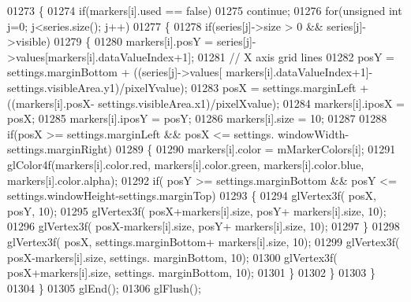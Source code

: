 \begin{DoxyCode}
{{{{{{{{{{01273         \{
01274             \textcolor{keywordflow}{if}(markers[i].used == \textcolor{keyword}{false})
01275                         \textcolor{keywordflow}{continue};
01276                     \textcolor{keywordflow}{for}(\textcolor{keywordtype}{unsigned} \textcolor{keywordtype}{int} j=0; j<series.size(); j++)
01277                     \{
01278                         \textcolor{keywordflow}{if}(series[j]->size > 0 && series[j]->visible)
01279                         \{
01280                             markers[i].posY = series[j]->values[markers[i].dataValueIndex+1];
01281                             \textcolor{comment}{// X axis grid lines}
01282                             posY = settings.marginBottom + ((series[j]->values[
      markers[i].dataValueIndex+1]-settings.visibleArea.y1)/pixelYvalue);
01283                             posX = settings.marginLeft + ((markers[i].posX-
      settings.visibleArea.x1)/pixelXvalue);
01284                             markers[i].iposX = posX;
01285                             markers[i].iposY = posY;
01286                             markers[i].size = 10;
01287 
01288                             \textcolor{keywordflow}{if}(posX >= settings.marginLeft && posX <= settings.
      windowWidth-settings.marginRight)
01289                             \{
01290                                 markers[i].color = mMarkerColors[i];
01291                                     glColor4f(markers[i].color.red, markers[i].color.green, 
      markers[i].color.blue, markers[i].color.alpha);
01292                                     \textcolor{keywordflow}{if}( posY >= settings.marginBottom && posY <= 
      settings.windowHeight-settings.marginTop)
01293                                     \{
01294                                             glVertex3f( posX, posY, 10);
01295                                             glVertex3f( posX+markers[i].size, posY+
      markers[i].size, 10);
01296                                             glVertex3f( posX-markers[i].size, posY+
      markers[i].size, 10);
01297                                     \}
01298                                     glVertex3f( posX, settings.marginBottom+
      markers[i].size, 10);
01299                                     glVertex3f( posX-markers[i].size, settings.
      marginBottom, 10);
01300                                     glVertex3f( posX+markers[i].size, settings.
      marginBottom, 10);
01301                             \}
01302                         \}
01303                     \}
01304         \}
01305         glEnd();
01306         glFlush();
}}}}}}}}}}
\end{DoxyCode}
